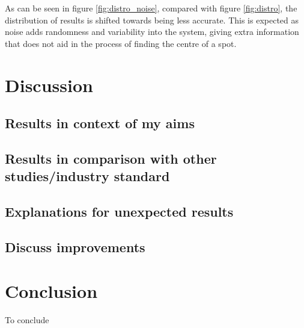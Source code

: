 \documentclass[aps,pra,a4paper,nofootinbib,onecolumn,tightenlines,longbibliography,12pt,amsfonts,amssymb,amsmath,floatfix]{revtex4-2} %
\begin{document}
As can be seen in figure \ref{fig:distro_noise}, compared with figure \ref{fig:distro}, the distribution
of results is shifted towards being less accurate. This is expected as noise adds randomness and 
variability into the system, giving extra information that does not aid in the process of finding the 
centre of a spot. 
  
  
      

\section{Discussion} %
\label{sec:Discussion}


  \subsection{Results in context of my aims} %
  \label{sub:Results in context of my aims}

  \subsection{Results in comparison with other studies/industry standard} %
  \label{sub:Results in comparison with other studies/industry standard}
  
  \subsection{Explanations for unexpected results} %
  \label{sub:Explanations for unexpected results}
  
  \subsection{Discuss improvements} %
  \label{sub:Discuss improvement}



\section{Conclusion} %
\label{sec:Conclusion}

To conclude 




\newpage

\end{document}
